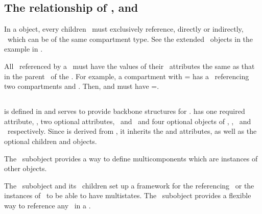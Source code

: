 \subsection{The relationship of ,  and }
\label{def:Relationships_CompartmentReferences}

In a  object, every children \compartmentReferences\ must exclusively reference, directly or indirectly,  \compartment\ which can be of the same compartment type. See the extended \ExCompartment\ objects in the example in .

All \compartments\ referenced by a \listOfCompartmentReferences\ must have the values of their \isTypeAtt\ attributes the same as that in the parent \compartment\ of the \listOfCompartmentReferences. For example, a compartment  with \isTypeAtt= has a \listOfCompartmentReferences\ referencing two compartments  and . Then,  and  must have \isTypeAtt=. 

\clearpage

\subsection{}
\label{def:SpeciesType}

 is defined in  and serves to provide backbone structures for \species.  has  one required attribute, \idAtt, two optional attributes, \nameAtt\ and \compartmentAtt\ and four optional  objects of \ListOfSpeciesFeatureTypes, \ListOfSpeciesTypeInstances, \ListOfInSpeciesTypeBonds\ and \ListOfSpeciesTypeComponentIndexes\ respectively.  Since  is derived from , it inherits the  and  attributes, as well as the optional children  and  objects.  

The \ListOfSpeciesTypeInstances\ subobject provides a way to define multicomponents which are instances of other  objects. 

The \ListOfSpeciesFeatureTypes\ subobject and its \SpeciesFeatureType\ children set up a framework for the referencing \species\ or the instances of \speciesTypes\ to be able to have multistates. The \ListOfSpeciesTypeComponentIndexes\ subobject provides a flexible way to reference any \component\ in a \speciesType. 

